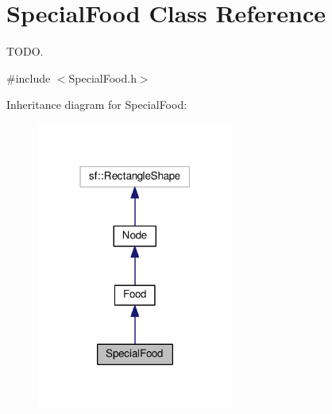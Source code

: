\hypertarget{classSpecialFood}{}\section{Special\+Food Class Reference}
\label{classSpecialFood}


T\+O\+DO.  




{\ttfamily \#include $<$Special\+Food.\+h$>$}



Inheritance diagram for Special\+Food\+:\nopagebreak
\begin{figure}[H]
\begin{center}
\leavevmode
\includegraphics[width=183pt]{classSpecialFood__inherit__graph}
\end{center}
\end{figure}


